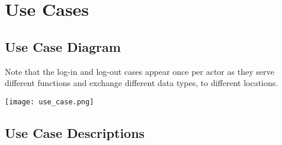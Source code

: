 \documentclass[11pt, english]{article}
\begin{document}
\newpage

\section{Use Cases}

	\subsection{Use Case Diagram}

	Note that the log-in and log-out cases appear once per actor as they serve different functions and exchange different data types, to different locations.

	\begin{center}
		\texttt{[image: use\_case.png]}
	\end{center}

	\subsection{Use Case Descriptions}
\end{document}
